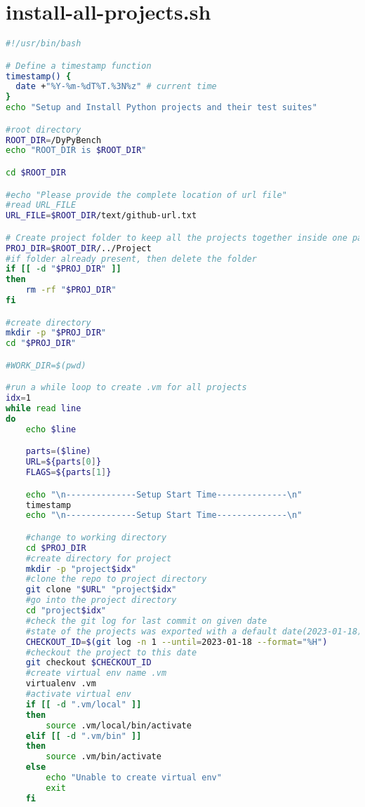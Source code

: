 \section{install-all-projects.sh}
\lstset{numbers=left, numberstyle=\tiny, stepnumber=1, numbersep=5pt, columns=flexible, breaklines=true, numberblanklines=false}
\lstset{basicstyle=\ttfamily}
\lstset{frame=tb}
\begin{lstlisting}[caption=install-all-projects.sh,label=code:install-all-projects.sh,language=Bash]
#!/usr/bin/bash

# Define a timestamp function
timestamp() {
  date +"%Y-%m-%dT%T.%3N%z" # current time
}
echo "Setup and Install Python projects and their test suites"

#root directory
ROOT_DIR=/DyPyBench
echo "ROOT_DIR is $ROOT_DIR"

cd $ROOT_DIR

#echo "Please provide the complete location of url file"
#read URL_FILE
URL_FILE=$ROOT_DIR/text/github-url.txt

# Create project folder to keep all the projects together inside one parent folder
PROJ_DIR=$ROOT_DIR/../Project
#if folder already present, then delete the folder
if [[ -d "$PROJ_DIR" ]]
then
    rm -rf "$PROJ_DIR" 
fi

#create directory
mkdir -p "$PROJ_DIR"
cd "$PROJ_DIR"

#WORK_DIR=$(pwd)

#run a while loop to create .vm for all projects
idx=1
while read line
do
    echo $line

    parts=($line)
    URL=${parts[0]}
    FLAGS=${parts[1]}

    echo "\n--------------Setup Start Time--------------\n" 
    timestamp
    echo "\n--------------Setup Start Time--------------\n"

    #change to working directory
    cd $PROJ_DIR
    #create directory for project
    mkdir -p "project$idx"
    #clone the repo to project directory
    git clone "$URL" "project$idx"
    #go into the project directory
    cd "project$idx"
    #check the git log for last commit on given date
    #state of the projects was exported with a default date(2023-01-18), if you change this date projects might no longer function properly due to code changes in the repository.
    CHECKOUT_ID=$(git log -n 1 --until=2023-01-18 --format="%H")
    #checkout the project to this date
    git checkout $CHECKOUT_ID
    #create virtual env name .vm
    virtualenv .vm
    #activate virtual env
    if [[ -d ".vm/local" ]]
    then
        source .vm/local/bin/activate
    elif [[ -d ".vm/bin" ]]
    then
        source .vm/bin/activate
    else
        echo "Unable to create virtual env"
        exit
    fi


\end{lstlisting}
